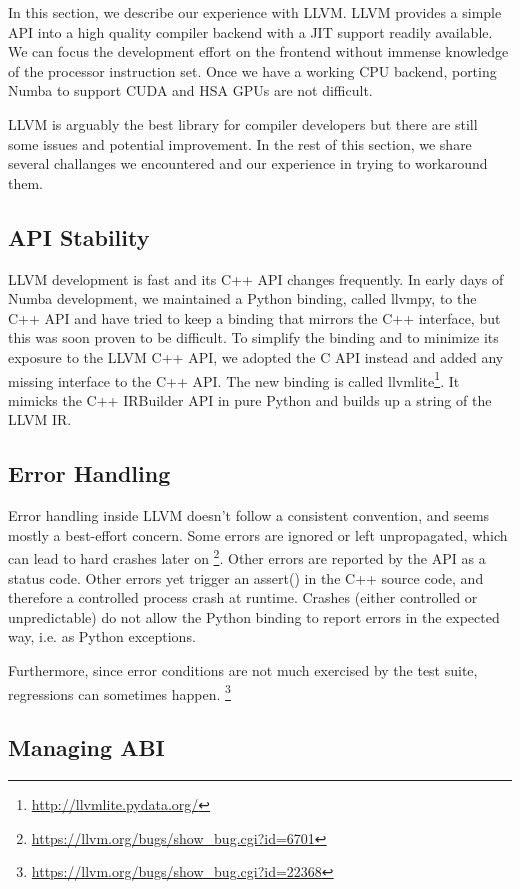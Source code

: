 \documentclass{acm_proc_article-sp}
\begin{document}
In this section, we describe our experience with LLVM.
LLVM provides a simple API into a high quality compiler backend with
a JIT support readily available. We can focus the development effort
on the frontend without immense knowledge of the processor instruction set.
Once we have a working CPU backend, porting Numba to support CUDA and HSA GPUs
are not difficult.

LLVM is arguably the best library for compiler developers but there are still
some issues and potential improvement. In the rest of
this section, we share several challanges we encountered and our experience
in trying to workaround them.

\subsection{API Stability}

LLVM development is fast and its C++ API changes frequently.
In early days of Numba development, we maintained a Python binding,
called llvmpy, to the C++ API and have tried to keep a binding that
mirrors the C++ interface, but this was soon proven to be difficult.
To simplify the binding and to minimize its exposure to the LLVM C++ API,
we adopted the C API instead and added any missing interface to the C++ API.
The new binding is called llvmlite\footnote{\url{http://llvmlite.pydata.org/}}.
It mimicks the C++ IRBuilder API in pure Python and builds up a string of the LLVM IR.

\subsection{Error Handling}

Error handling inside LLVM doesn't follow a consistent convention,
and seems mostly a best-effort concern.  Some errors are ignored or
left unpropagated, which can lead to hard crashes later on
\footnote{\url{https://llvm.org/bugs/show_bug.cgi?id=6701}}.
Other errors are reported by the API as a status
code.  Other errors yet trigger an assert() in the C++ source code, and
therefore a controlled process crash at runtime.  Crashes (either
controlled or unpredictable) do not allow the Python binding to report
errors in the expected way, i.e. as Python exceptions.

Furthermore, since error conditions are not much exercised by the test
suite, regressions can sometimes happen.
\footnote{\url{https://llvm.org/bugs/show_bug.cgi?id=22368}}

\subsection{Managing ABI}
\end{document}
